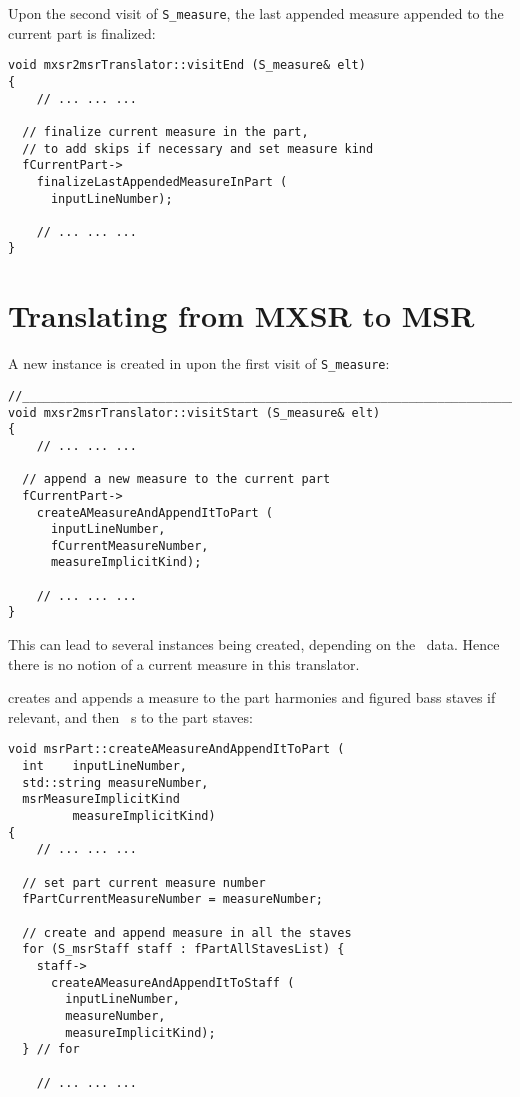 Upon the second visit of {\tt S_measure}, the last appended measure appended to the current part is finalized:
\begin{lstlisting}[language=CPlusPlus]
void mxsr2msrTranslator::visitEnd (S_measure& elt)
{
	// ... ... ...

  // finalize current measure in the part,
  // to add skips if necessary and set measure kind
  fCurrentPart->
    finalizeLastAppendedMeasureInPart (
      inputLineNumber);

	// ... ... ...
}
\end{lstlisting}


\section{Translating from MXSR to MSR}

A new  instance is created in  upon the first visit of {\tt S_measure}:
\begin{lstlisting}[language=CPlusPlus]
//________________________________________________________________________
void mxsr2msrTranslator::visitStart (S_measure& elt)
{
	// ... ... ...

  // append a new measure to the current part
  fCurrentPart->
    createAMeasureAndAppendItToPart (
      inputLineNumber,
      fCurrentMeasureNumber,
      measureImplicitKind);

	// ... ... ...
}
\end{lstlisting}

This can lead to several  instances being created, depending on the \mxml\ data. Hence there is no notion of a current measure in this translator.

 creates and appends a measure to the part harmonies and figured bass staves if relevant, and then \cascade\ s to the part staves:
\begin{lstlisting}[language=CPlusPlus]
void msrPart::createAMeasureAndAppendItToPart (
  int    inputLineNumber,
  std::string measureNumber,
  msrMeasureImplicitKind
         measureImplicitKind)
{
	// ... ... ...

  // set part current measure number
  fPartCurrentMeasureNumber = measureNumber;

  // create and append measure in all the staves
  for (S_msrStaff staff : fPartAllStavesList) {
    staff->
      createAMeasureAndAppendItToStaff (
        inputLineNumber,
        measureNumber,
        measureImplicitKind);
  } // for

	// ... ... ...
\end{lstlisting}




